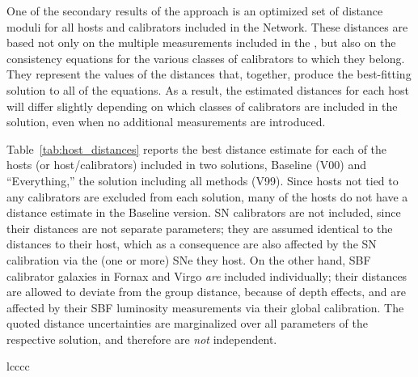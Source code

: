 One of the secondary results of the {\DN} approach is an optimized set of distance moduli for all hosts and calibrators included in the Network.  These distances are based not only on the multiple measurements included in the {\DN}, but also on the consistency equations for the various classes of calibrators to which they belong.  They represent the values of the distances that, together, produce the best-fitting solution to all of the {\DN} equations.  As a result, the estimated distances for each host will differ slightly depending on which classes of calibrators are included in the solution, even when no additional measurements are introduced.

Table~\ref{tab:host_distances} reports the best distance estimate for each of the hosts (or host/calibrators) included in two solutions, Baseline (V00) and ``Everything,'' the solution including all methods (V99).  Since hosts not tied to any calibrators are excluded from each solution, many of the hosts do not have a distance estimate in the Baseline version.  SN calibrators are not included, since their distances are not separate parameters; they are assumed identical to the distances to their host, which as a consequence are also affected by the SN calibration via the (one or more) SNe they host.  On the other hand, SBF calibrator galaxies in Fornax and Virgo \textit{are} included individually; their distances are allowed to deviate from the group distance, because of depth effects, and are affected by their SBF luminosity measurements via their global calibration.  The quoted distance uncertainties are marginalized over all parameters of the respective {\DN} solution, and therefore are \textit{not} independent.

\startlongtable
\begin{deluxetable}{lcccc}
\tabletypesize{\scriptsize}
\startdata

\enddata
\end{deluxetable}

